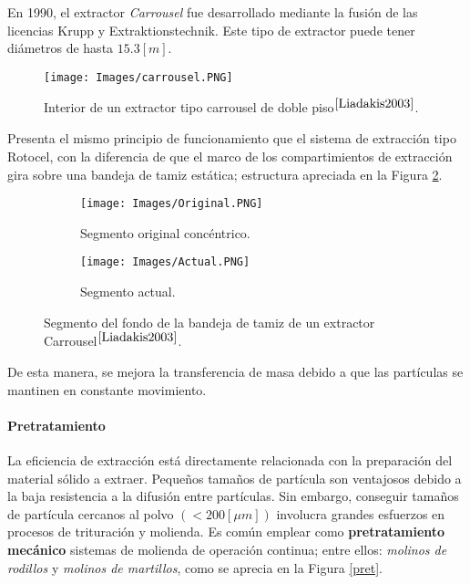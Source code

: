 \noindent
\justify

En 1990, el extractor \textit{Carrousel} fue desarrollado mediante la fusi\'on de las licencias Krupp y Extraktionstechnik. Este tipo de extractor puede tener di\'ametros de hasta $15.3 [m]$.

\begin{figure}[h!]
	\centering
	\texttt{[image: Images/carrousel.PNG]}
	\caption{Interior de un extractor tipo carrousel de doble piso$^{\cite{Liadakis2003}}$.}
	\label{carrousel}
\end{figure}

\noindent
\justify

Presenta el mismo principio de funcionamiento que el sistema de extracci\'on tipo Rotocel, con la diferencia de que el marco de los compartimientos de extracci\'on gira sobre una bandeja de tamiz est\'atica; estructura apreciada en la Figura \ref{tamiz}. 

\begin{figure}[h!]
	\centering
	\begin{subfigure}[b]{0.48\textwidth}
		\centering
		\texttt{[image: Images/Original.PNG]}
	\caption{Segmento original conc\'entrico.}
	\end{subfigure}
	\hfill
	\begin{subfigure}[b]{0.5\textwidth}
		\centering
		\texttt{[image: Images/Actual.PNG]}
	\caption{Segmento actual.}
	\end{subfigure}
	\caption{Segmento del fondo de la bandeja de tamiz de un extractor Carrousel$^{\cite{Liadakis2003}}$.}
	\label{tamiz}
\end{figure}

\noindent
\justify

De esta manera, se mejora la transferencia de masa debido a que las part\'iculas se mantinen en constante movimiento.

\paragraph{Pretratamiento}

\noindent
\justify

La eficiencia de extracci\'on est\'a directamente relacionada con la preparaci\'on del material s\'olido a extraer. Peque\~nos tama\~nos de part\'icula son ventajosos debido a la baja resistencia a la difusi\'on entre part\'iculas. Sin embargo, conseguir tama\~nos de part\'icula cercanos al polvo $\left( < 200 \left[ \mu m \right] \right)$ involucra grandes esfuerzos en procesos de trituraci\'on y molienda. Es com\'un emplear como \textbf{pretratamiento mec\'anico} sistemas de molienda de operaci\'on continua; entre ellos: \textit{molinos de rodillos} y \textit{molinos de martillos}, como se aprecia en la Figura \ref{pret}.

